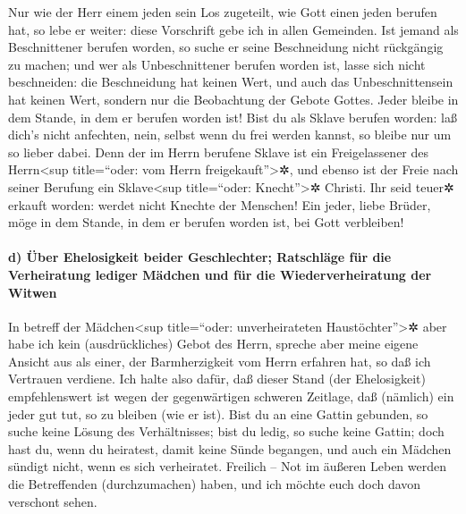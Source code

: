  Nur wie der Herr einem jeden sein Los zugeteilt, wie
Gott einen jeden berufen hat, so lebe er weiter: diese Vorschrift gebe
ich in allen Gemeinden.  Ist jemand als Beschnittener
berufen worden, so suche er seine Beschneidung nicht rückgängig zu
machen; und wer als Unbeschnittener berufen worden ist, lasse sich nicht
beschneiden:  die Beschneidung hat keinen Wert, und auch
das Unbeschnittensein hat keinen Wert, sondern nur die Beobachtung der
Gebote Gottes.  Jeder bleibe in dem Stande, in dem er
berufen worden ist!  Bist du als Sklave berufen worden:
laß dich's nicht anfechten, nein, selbst wenn du frei werden kannst, so
bleibe nur um so lieber dabei.  Denn der im Herrn
berufene Sklave ist ein Freigelassener des Herrn\textless sup
title=``oder: vom Herrn freigekauft''\textgreater✲, und ebenso ist der
Freie nach seiner Berufung ein Sklave\textless sup title=``oder:
Knecht''\textgreater✲ Christi.  Ihr seid teuer✲ erkauft
worden: werdet nicht Knechte der Menschen!  Ein jeder,
liebe Brüder, möge in dem Stande, in dem er berufen worden ist, bei Gott
verbleiben!

\hypertarget{d-uxfcber-ehelosigkeit-beider-geschlechter-ratschluxe4ge-fuxfcr-die-verheiratung-lediger-muxe4dchen-und-fuxfcr-die-wiederverheiratung-der-witwen}{%
\paragraph{d) Über Ehelosigkeit beider Geschlechter; Ratschläge für die
Verheiratung lediger Mädchen und für die Wiederverheiratung der
Witwen}\label{d-uxfcber-ehelosigkeit-beider-geschlechter-ratschluxe4ge-fuxfcr-die-verheiratung-lediger-muxe4dchen-und-fuxfcr-die-wiederverheiratung-der-witwen}}

 In betreff der Mädchen\textless sup title=``oder:
unverheirateten Haustöchter''\textgreater✲ aber habe ich kein
(ausdrückliches) Gebot des Herrn, spreche aber meine eigene Ansicht aus
als einer, der Barmherzigkeit vom Herrn erfahren hat, so daß ich
Vertrauen verdiene.  Ich halte also dafür, daß dieser
Stand (der Ehelosigkeit) empfehlenswert ist wegen der gegenwärtigen
schweren Zeitlage, daß (nämlich) ein jeder gut tut, so zu bleiben (wie
er ist).  Bist du an eine Gattin gebunden, so suche keine
Lösung des Verhältnisses; bist du ledig, so suche keine Gattin;
 doch hast du, wenn du heiratest, damit keine Sünde
begangen, und auch ein Mädchen sündigt nicht, wenn es sich verheiratet.
Freilich -- Not im äußeren Leben werden die Betreffenden (durchzumachen)
haben, und ich möchte euch doch davon verschont sehen.

